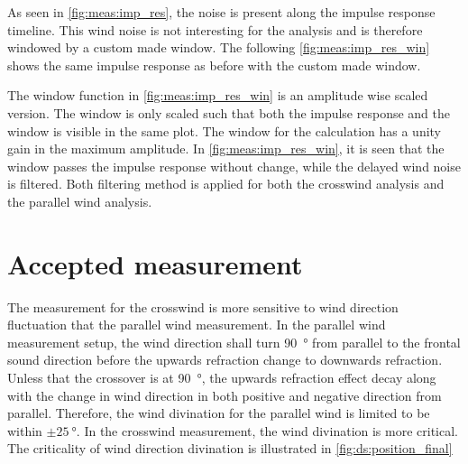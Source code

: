 

As seen in \autoref{fig:meas:imp_res}, the noise is present along the impulse response timeline. This wind noise is not interesting for the analysis and is therefore windowed by a custom made window. The following \autoref{fig:meas:imp_res_win} shows the same impulse response as before with the custom made window.



The window function in \autoref{fig:meas:imp_res_win} is an amplitude wise scaled version. The window is only scaled such that both the impulse response and the window is visible in the same plot. The window for the calculation has a unity gain in the maximum amplitude. In \autoref{fig:meas:imp_res_win}, it is seen that the window passes the impulse response without change, while the delayed wind noise is filtered. Both filtering method is applied for both the crosswind analysis and the parallel wind analysis. 


\section{Accepted measurement}
The measurement for the crosswind is more sensitive to wind direction fluctuation that the parallel wind measurement. In the parallel wind measurement setup, the wind direction shall turn \SI{90}{\degree} from parallel to the frontal sound direction before the upwards refraction change to downwards refraction. Unless that the crossover is at \SI{90}{\degree}, the upwards refraction effect decay along with the change in wind direction in both positive and negative direction from parallel. Therefore, the wind divination for the parallel wind is limited to be within $\pm\SI{25}{\degree}$. In the crosswind measurement, the wind divination is more critical. The criticality of wind direction divination is illustrated in \autoref{fig:ds:position_final}


